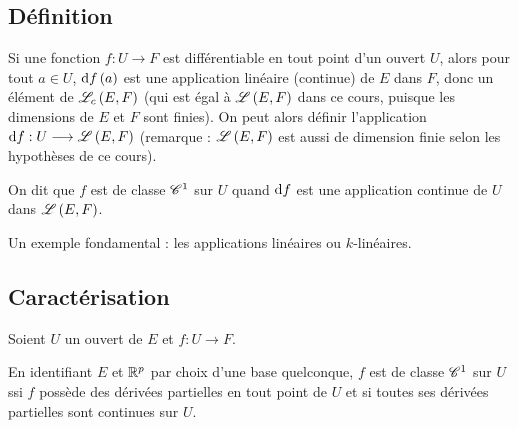 \subsection{Définition}

Si une fonction \(f:U\to F\) est différentiable en tout point d'un ouvert \(U\), alors pour tout \(a\in U\), \(\odif{f}\paren{a}\) est une application linéaire (continue) de \(E\) dans \(F\), donc un élément de \(\mathscr{L}_c\left(E,F\right)\) (qui est égal à \(\mathscr{L}\left(E,F\right)\) dans ce cours, puisque les dimensions de \(E\) et \(F\) sont finies). On peut alors définir l'application \(\odif{f}:U\to\L{E}{F}\) (remarque : \(\mathscr{L}\left(E,F\right)\) est aussi de dimension finie selon les hypothèses de ce cours).

\begin{defi}
On dit que \(f\) est de classe \(\mathscr{C}^{1}\) sur \(U\) quand \(\odif{f}\) est une application continue de \(U\) dans \(\mathscr{L}\left(E,F\right)\).
\end{defi}

Un exemple fondamental : les applications linéaires ou \(k\)-linéaires.

\subsection{Caractérisation}

\begin{theo}
Soient \(U\) un ouvert de \(E\) et \(f:U\to F\).

En identifiant \(E\) et \(\mathbb{R}^p\) par choix d'une base quelconque, \(f\) est de classe \(\mathscr{C}^{1}\) sur \(U\) ssi \(f\) possède des dérivées partielles en tout point de \(U\) et si toutes ses dérivées partielles sont continues sur \(U\).
\end{theo}

